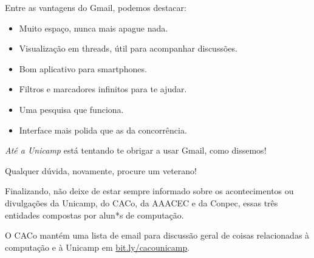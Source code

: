 Entre as vantagens do Gmail, podemos destacar:

\begin{itemize}
    \item Muito espaço, nunca mais apague nada.
    \item Visualização em threads, útil para acompanhar discussões.
    \item Bom aplicativo para smartphones.
    \item Filtros e marcadores infinitos para te ajudar.
    \item Uma pesquisa que funciona.
    \item Interface mais polida que as da concorrência.
\end{itemize}

\emph{Até a Unicamp} está tentando te obrigar a usar Gmail, como dissemos!
\shrug

Qualquer dúvida, novamente, procure um veterano!

Finalizando, não deixe de estar sempre informado sobre os acontecimentos ou
divulgações da Unicamp, do CACo, da AAACEC e da Conpec, essas três entidades
compostas por alun*s de computação.

O CACo mantém uma lista de email para discussão geral de coisas relacionadas à
computação e à Unicamp em
\url{bit.ly/cacounicamp}.
